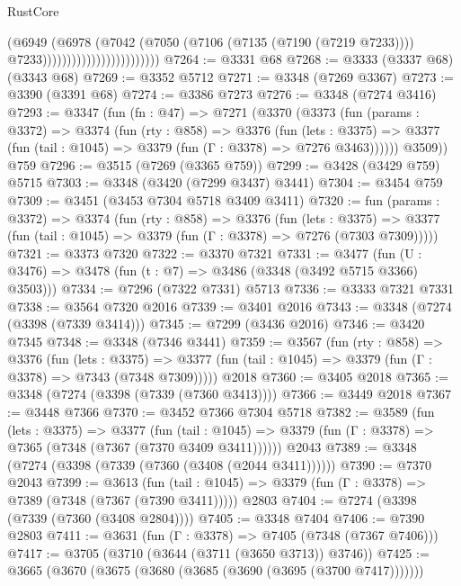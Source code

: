 \begin{lexlean}{RustCore}
\begin{coremodule}
                                            (@6949
                                              (@6978
                                                (@7042
                                                  (@7050
                                                    (@7106 (@7135 (@7190 (@7219 @7233))))
                                                    @7233))))))))))))))))))))))))
@7264 := @3331 @68
@7268 := @3333 (@3337 @68) (@3343 @68)
@7269 := @3352 @5712
@7271 := @3348 (@7269 @3367)
@7273 := @3390 (@3391 @68)
@7274 := @3386 @7273
@7276 := @3348 (@7274 @3416)
@7293 := @3347
    (fun (fn : @47) =>
    @7271
      (@3370
        (@3373
          (fun (params : @3372) =>
          @3374
            (fun (rty : @858) =>
            @3376
              (fun (lets : @3375) =>
              @3377 (fun (tail : @1045) => @3379 (fun (Γ : @3378) => @7276 @3463))))))
        @3509))
    @759
@7296 := @3515 (@7269 (@3365 @759))
@7299 := @3428 (@3429 @759) @5715
@7303 := @3348 (@3420 (@7299 @3437) @3441)
@7304 := @3454 @759
@7309 := @3451 (@3453 @7304 @5718 @3409 @3411)
@7320 := fun (params : @3372) =>
  @3374
    (fun (rty : @858) =>
    @3376
      (fun (lets : @3375) =>
      @3377 (fun (tail : @1045) => @3379 (fun (Γ : @3378) => @7276 (@7303 @7309)))))
@7321 := @3373 @7320
@7322 := @3370 @7321
@7331 := @3477 (fun (U : @3476) => @3478 (fun (t : @7) => @3486 (@3348 (@3492 @5715 @3366) @3503)))
@7334 := @7296 (@7322 @7331) @5713
@7336 := @3333 @7321 @7331
@7338 := @3564 @7320 @2016
@7339 := @3401 @2016
@7343 := @3348 (@7274 (@3398 (@7339 @3414)))
@7345 := @7299 (@3436 @2016)
@7346 := @3420 @7345
@7348 := @3348 (@7346 @3441)
@7359 := @3567
    (fun (rty : @858) =>
    @3376
      (fun (lets : @3375) =>
      @3377 (fun (tail : @1045) => @3379 (fun (Γ : @3378) => @7343 (@7348 @7309)))))
    @2018
@7360 := @3405 @2018
@7365 := @3348 (@7274 (@3398 (@7339 (@7360 @3413))))
@7366 := @3449 @2018
@7367 := @3448 @7366
@7370 := @3452 @7366 @7304 @5718
@7382 := @3589
    (fun (lets : @3375) =>
    @3377
      (fun (tail : @1045) => @3379 (fun (Γ : @3378) => @7365 (@7348 (@7367 (@7370 @3409 @3411))))))
    @2043
@7389 := @3348 (@7274 (@3398 (@7339 (@7360 (@3408 (@2044 @3411))))))
@7390 := @7370 @2043
@7399 := @3613
    (fun (tail : @1045) => @3379 (fun (Γ : @3378) => @7389 (@7348 (@7367 (@7390 @3411)))))
    @2803
@7404 := @7274 (@3398 (@7339 (@7360 (@3408 @2804))))
@7405 := @3348 @7404
@7406 := @7390 @2803
@7411 := @3631 (fun (Γ : @3378) => @7405 (@7348 (@7367 @7406)))
@7417 := @3705 (@3710 (@3644 (@3711 (@3650 @3713)) @3746))
@7425 := @3665 (@3670 (@3675 (@3680 (@3685 (@3690 (@3695 (@3700 @7417)))))))

\end{coremodule}
\end{lexlean}
